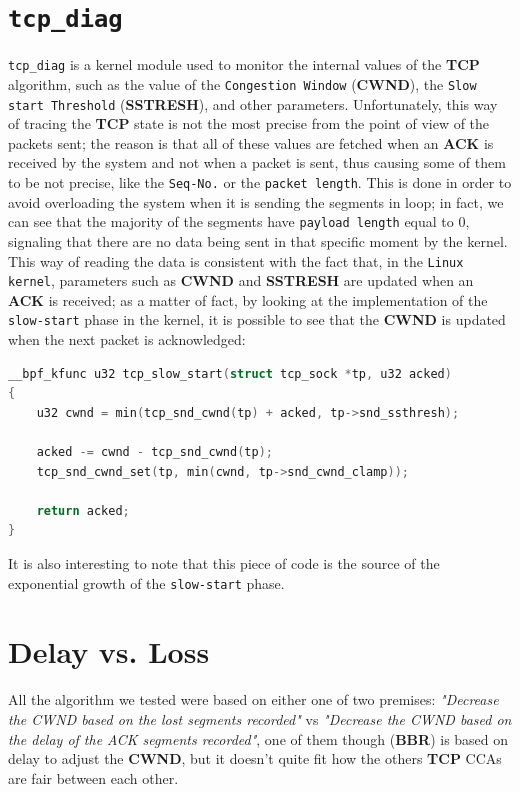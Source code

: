 \documentclass{exam}
\begin{document}
\section{\texttt{tcp\_diag}}
\verb|tcp_diag| is a kernel module used to monitor the internal values of the \textbf{TCP} algorithm, such as the value of the \texttt{Congestion Window} (\textbf{CWND}), the \texttt{Slow start Threshold} (\textbf{SSTRESH}), and other parameters. Unfortunately, this way of tracing the \textbf{TCP} state is not the most precise from the point of view of the packets sent; the reason is that all of these values are fetched when an \textbf{ACK} is received by the system and not when a packet is sent, thus causing some of them to be not precise, like the \texttt{Seq-No.} or the \texttt{packet length}. This is done in order to avoid overloading the system when it is sending the segments in loop; in fact, we can see that the majority of the segments have \texttt{payload length} equal to 0, signaling that there are no data being sent in that specific moment by the kernel. This way of reading the data is consistent with the fact that, in the \texttt{Linux kernel}, parameters such as \textbf{CWND} and \textbf{SSTRESH} are updated when an \textbf{ACK} is received; as a matter of fact, by looking at the implementation of the \texttt{slow-start} phase in the kernel, it is possible to see that the \textbf{CWND} is updated when the next packet is acknowledged:
\begin{lstlisting}[language=c]
__bpf_kfunc u32 tcp_slow_start(struct tcp_sock *tp, u32 acked)
{
	u32 cwnd = min(tcp_snd_cwnd(tp) + acked, tp->snd_ssthresh);

	acked -= cwnd - tcp_snd_cwnd(tp);
	tcp_snd_cwnd_set(tp, min(cwnd, tp->snd_cwnd_clamp));

	return acked;
}
\end{lstlisting}
It is also interesting to note that this piece of code is the source of the exponential growth of the \texttt{slow-start} phase.

\section{Delay vs. Loss}
All the algorithm we tested were based on either one of two premises: \textit{"Decrease the CWND based on the lost segments recorded"} vs \textit{"Decrease the CWND based on the delay of the ACK segments recorded"}, one of them though (\textbf{BBR}) is based on delay to adjust the \textbf{CWND}, but it doesn't quite fit how the others \textbf{TCP} CCAs are fair between each other.
\end{document}
